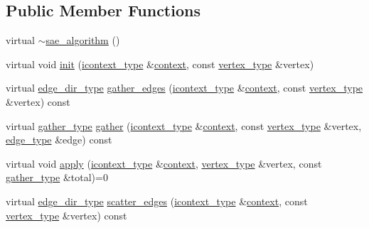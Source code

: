 \subsection*{Public Member Functions}
\begin{DoxyCompactItemize}
\item 
virtual \hyperlink{classsaedb_1_1sae__algorithm_ae67be2fe37126b9ab28b1be43a6b1e96}{$\sim$sae\-\_\-algorithm} ()
\item 
virtual void \hyperlink{classsaedb_1_1sae__algorithm_aae58b92247a316b2734704e24ee20700}{init} (\hyperlink{classsaedb_1_1sae__algorithm_a190f07adbc04f0188ad09b50dbe93a33}{icontext\-\_\-type} \&\hyperlink{classsaedb_1_1context}{context}, const \hyperlink{classsaedb_1_1sae__algorithm_ae26abf349aed2b0c9f82e1396b78561a}{vertex\-\_\-type} \&vertex)
\item 
virtual \hyperlink{namespacesaedb_adf5ad13c09a48fb2f42f8e7348ea3ac3}{edge\-\_\-dir\-\_\-type} \hyperlink{classsaedb_1_1sae__algorithm_aa2930d50f01ae01c12639a19e517329f}{gather\-\_\-edges} (\hyperlink{classsaedb_1_1sae__algorithm_a190f07adbc04f0188ad09b50dbe93a33}{icontext\-\_\-type} \&\hyperlink{classsaedb_1_1context}{context}, const \hyperlink{classsaedb_1_1sae__algorithm_ae26abf349aed2b0c9f82e1396b78561a}{vertex\-\_\-type} \&vertex) const 
\item 
virtual \hyperlink{classsaedb_1_1sae__algorithm_a4c57e65dd3987f19d5d90bf394c8f2f8}{gather\-\_\-type} \hyperlink{classsaedb_1_1sae__algorithm_aef9f7edc10a5e76234157db8c9c8c2bb}{gather} (\hyperlink{classsaedb_1_1sae__algorithm_a190f07adbc04f0188ad09b50dbe93a33}{icontext\-\_\-type} \&\hyperlink{classsaedb_1_1context}{context}, const \hyperlink{classsaedb_1_1sae__algorithm_ae26abf349aed2b0c9f82e1396b78561a}{vertex\-\_\-type} \&vertex, \hyperlink{classsaedb_1_1sae__algorithm_aaebb1836596e0efad3d694a5b829871f}{edge\-\_\-type} \&edge) const 
\item 
virtual void \hyperlink{classsaedb_1_1sae__algorithm_a25fcc38700d5209fb2dcc81771253033}{apply} (\hyperlink{classsaedb_1_1sae__algorithm_a190f07adbc04f0188ad09b50dbe93a33}{icontext\-\_\-type} \&\hyperlink{classsaedb_1_1context}{context}, \hyperlink{classsaedb_1_1sae__algorithm_ae26abf349aed2b0c9f82e1396b78561a}{vertex\-\_\-type} \&vertex, const \hyperlink{classsaedb_1_1sae__algorithm_a4c57e65dd3987f19d5d90bf394c8f2f8}{gather\-\_\-type} \&total)=0
\item 
virtual \hyperlink{namespacesaedb_adf5ad13c09a48fb2f42f8e7348ea3ac3}{edge\-\_\-dir\-\_\-type} \hyperlink{classsaedb_1_1sae__algorithm_adfc160930509d2259cb98f96a80d1232}{scatter\-\_\-edges} (\hyperlink{classsaedb_1_1sae__algorithm_a190f07adbc04f0188ad09b50dbe93a33}{icontext\-\_\-type} \&\hyperlink{classsaedb_1_1context}{context}, const \hyperlink{classsaedb_1_1sae__algorithm_ae26abf349aed2b0c9f82e1396b78561a}{vertex\-\_\-type} \&vertex) const 

\end{DoxyCompactItemize}
